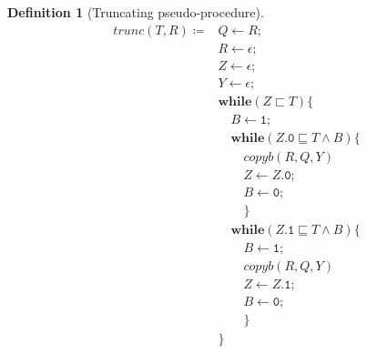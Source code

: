 \documentclass[10pt]{amsart}
\newcommand{\zero}{\mathtt{0}}
\newcommand{\one}{\mathtt{1}}
\newcommand{\while}[2]{\mathbf{while}(#1)\{#2\}}
\newcommand{\takes}{\leftarrow}
\newtheorem{defn}{Definition}
\begin{document}
\begin{defn}[Truncating pseudo-procedure]
\begin{comment}
                      &\quad \quad \quad B \takes \zero;\\
                      &\quad \quad \quad }\\
                      &\quad \quad \while {R.\one \sqsubseteq Q \land B} {\\
                      &\quad \quad \quad R \takes R.\one;\\
                      &\quad \quad \quad B \takes \zero;\\
                      &\quad \quad \quad }\\
                      &\quad \quad Z \takes Z.0;\\
                      &\quad \quad B \takes 0;\\
                      &\quad \quad }\\
                      &}
\end{align*}
\end{comment}
\begin{align*}
trunc(T, R) \coloneqq &Q \takes R;\\
                      &R \takes \epsilon;\\
                      &Z \takes \epsilon;\\
                      &Y \takes \epsilon;\\
                      &\while {Z \sqsubset T} {\\
                      &\quad B \takes \one;\\
                      &\quad \while {Z.\zero \sqsubseteq T \land B} {\\
                      &\quad \quad copyb(R, Q, Y)\\
                      &\quad \quad Z \takes Z.\zero;\\
                      &\quad \quad B \takes \zero;\\
                      &\quad \quad }\\
                      &\quad \while {Z.\one \sqsubseteq T \land B} {\\
                      &\quad \quad B \takes \one;\\
                      &\quad \quad copyb(R, Q, Y)\\
                      &\quad \quad Z \takes Z.\one;\\
                      &\quad \quad B \takes \zero;\\
                      &\quad \quad }\\
                      &}
\end{align*}
\end{defn}
\end{document}

